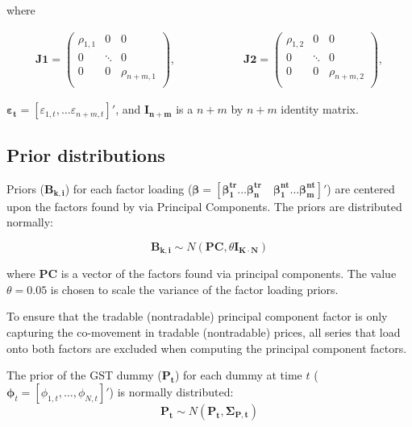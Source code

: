 \documentclass[11pt,english,a4paper]{article}
\begin{document}
where

\begin{eqnarray*}
\mathbf{J1}
=
\begin{pmatrix}
\rho_{1,1}  & 0         & 0\\
0           & \ddots    & 0\\
0           & 0         & \rho_{n+m,1}\\
\end{pmatrix},
\qquad \qquad \qquad
\mathbf{J2}
=
\begin{pmatrix}
\rho_{1,2}  & 0         & 0\\
0           & \ddots    & 0\\
0           & 0         & \rho_{n+m,2}\\
\end{pmatrix},
\end{eqnarray*}

$\boldsymbol{\varepsilon_{t}} = [\varepsilon_{1,t}, \ldots \varepsilon_{n+m,t}]'$, and $\mathbf{I_{n+m}}$  is a $n+m$ by $n+m$ identity matrix.


\subsection*{Prior distributions}

Priors ($\mathbf{B_{k,i}}$) for each factor loading ($\boldsymbol{\beta} = [\boldsymbol{\beta^{tr}_1} \ldots \boldsymbol{\beta^{tr}_n} \quad \boldsymbol{\beta^{nt}_1} \ldots \boldsymbol{\beta^{nt}_m} ]'$) are centered upon the factors found by via Principal Components. The priors are distributed normally:

\begin{equation*}
\mathbf{B_{k,i}} \sim N \left( \mathbf{PC}, \theta \mathbf{I_{K\cdot N}} \right)
\end{equation*}

where $\mathbf{PC}$ is a vector of the factors found via principal components. The value $\theta=0.05$ is chosen to scale the variance of the factor loading priors.

To ensure that the tradable (nontradable) principal component factor is only capturing the co-movement in tradable (nontradable) prices, all series that load onto both factors are excluded when computing the principal component factors.


The prior of the GST dummy ($\mathbf{P_{t}}$) for each dummy at time $t$ ($\boldsymbol{\phi}_{t} = [\phi_{1,t}, \ldots, \phi_{N,t}]'$) is normally distributed:
\begin{equation*}
\mathbf{P_{t}} \sim N \left( \mathbf{P_{t}}, \boldsymbol{\Sigma_{P,t}} \right)
\end{equation*}
\end{document}
